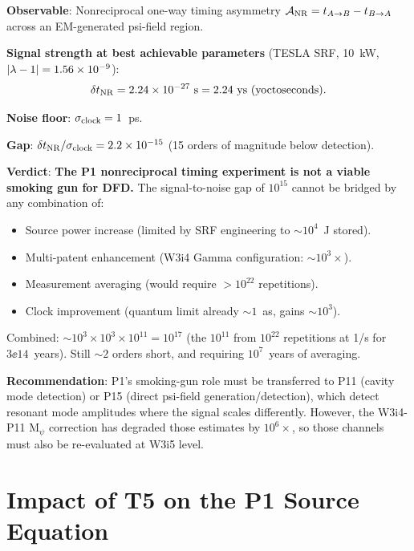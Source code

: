 \begin{tcolorbox}[colback=red!3!white, colframe=red!50!black,
  title=\textbf{Corrected Smoking-Gun Assessment for P1 (Field Drag / Gravitational Cloaking)}]

\textbf{Observable}: Nonreciprocal one-way timing asymmetry
$\mathcal{A}_{\rm NR} = t_{A\to B} - t_{B\to A}$ across an EM-generated
psi-field region.

\textbf{Signal strength at best achievable parameters}
(TESLA SRF, 10~kW, $|\lambda - 1| = 1.56\times 10^{-9}$):
\begin{equation}
\delta t_{\rm NR} = 2.24\times 10^{-27}~\text{s} = 2.24~\text{ys (yoctoseconds)}.
\end{equation}

\textbf{Noise floor}: $\sigma_{\rm clock} = 1$~ps.

\textbf{Gap}: $\delta t_{\rm NR} / \sigma_{\rm clock} = 2.2\times 10^{-15}$
(15 orders of magnitude below detection).

\textbf{Verdict}: \textcolor{falsified}{\textbf{The P1 nonreciprocal timing
experiment is not a viable smoking gun for DFD.}} The signal-to-noise gap
of $10^{15}$ cannot be bridged by any combination of:
\begin{itemize}[nosep]
\item Source power increase (limited by SRF engineering to $\sim 10^4$~J stored).
\item Multi-patent enhancement (W3i4 Gamma configuration: $\sim 10^3\times$).
\item Measurement averaging (would require $>10^{22}$ repetitions).
\item Clock improvement (quantum limit already $\sim 1$~as, gains $\sim 10^3$).
\end{itemize}
Combined: $\sim 10^3 \times 10^3 \times 10^{11} = 10^{17}$ (the $10^{11}$
from $10^{22}$ repetitions at 1/s for $3\ee{14}$~years). Still $\sim 2$
orders short, and requiring $10^7$~years of averaging.

\textbf{Recommendation}: P1's smoking-gun role must be transferred to P11
(cavity mode detection) or P15 (direct psi-field generation/detection),
which detect resonant mode amplitudes where the signal scales differently.
However, the W3i4-P11 M$_\psi$ correction has degraded those estimates by
$10^6\times$, so those channels must also be re-evaluated at W3i5 level.
\end{tcolorbox}

\section{Impact of T5 on the P1 Source Equation}
\label{sec:T5_source}

